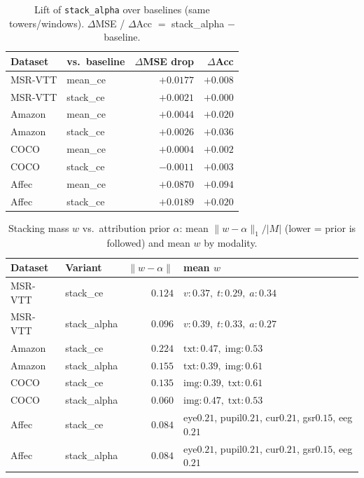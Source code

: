 \begin{table}[t]
\centering
\caption{Lift of \texttt{stack\_alpha} over baselines (same towers/windows).
$\Delta$MSE / $\Delta$Acc $=$ stack\_alpha $-$ baseline.}
\label{tab:agod-vimp-stacking-lift}
\begin{tabular}{llrr}
\toprule
Dataset & vs.\ baseline & $\Delta$MSE drop & $\Delta$Acc \\
\midrule
MSR-VTT & mean\_ce  & $+0.0177$ & $+0.008$ \\
MSR-VTT & stack\_ce & $+0.0021$ & $+0.000$ \\
Amazon  & mean\_ce  & $+0.0044$ & $+0.020$ \\
Amazon  & stack\_ce & $+0.0026$ & $+0.036$ \\
COCO    & mean\_ce  & $+0.0004$ & $+0.002$ \\
COCO    & stack\_ce & $-0.0011$ & $+0.003$ \\
Affec   & mean\_ce  & $+0.0870$ & $+0.094$ \\
Affec   & stack\_ce & $+0.0189$ & $+0.020$ \\
\bottomrule
\end{tabular}
\end{table}

\begin{table}[t]
\centering
\caption{Stacking mass $w$ vs.\ attribution prior $\alpha$: mean $\|w-\alpha\|_1/|M|$
(lower = prior is followed) and mean $w$ by modality.}
\label{tab:agod-vimp-stacking-weights}
\begin{tabular}{llrl}
\toprule
Dataset & Variant & $\|w-\alpha\|$ & mean $w$ \\
\midrule
MSR-VTT & stack\_ce    & $0.124$ & $v{:}0.37,\; t{:}0.29,\; a{:}0.34$ \\
MSR-VTT & stack\_alpha & $0.096$ & $v{:}0.39,\; t{:}0.33,\; a{:}0.27$ \\
Amazon  & stack\_ce    & $0.224$ & $\mathrm{txt}{:}0.47,\; \mathrm{img}{:}0.53$ \\
Amazon  & stack\_alpha & $0.155$ & $\mathrm{txt}{:}0.39,\; \mathrm{img}{:}0.61$ \\
COCO    & stack\_ce    & $0.135$ & $\mathrm{img}{:}0.39,\; \mathrm{txt}{:}0.61$ \\
COCO    & stack\_alpha & $0.060$ & $\mathrm{img}{:}0.47,\; \mathrm{txt}{:}0.53$ \\
Affec   & stack\_ce    & $0.084$ & eye$0.21$, pupil$0.21$, cur$0.21$, gsr$0.15$, eeg$0.21$ \\
Affec   & stack\_alpha & $0.084$ & eye$0.21$, pupil$0.21$, cur$0.21$, gsr$0.15$, eeg$0.21$ \\
\bottomrule
\end{tabular}
\end{table}

